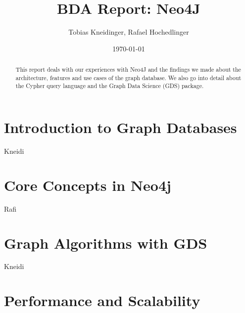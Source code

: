 \documentclass[english,notitlepage,smartquotes]{hgbreport}
\begin{document}

\author{Tobias Kneidinger, Rafael Hochedlinger}                      %
\title{BDA Report: Neo4J} %
\date{\today}

\maketitle

\begin{abstract}\noindent
This report deals with our experiences with Neo4J and the findings we made about the architecture, features and use cases of the graph database. We also go into detail about the Cypher query language and the Graph Data Science (GDS) package.
\end{abstract}


\section{Introduction to Graph Databases}

Kneidi


\section{Core Concepts in Neo4j}

Rafi


\section{Graph Algorithms with GDS}

Kneidi


\section{Performance and Scalability}
\end{document}
